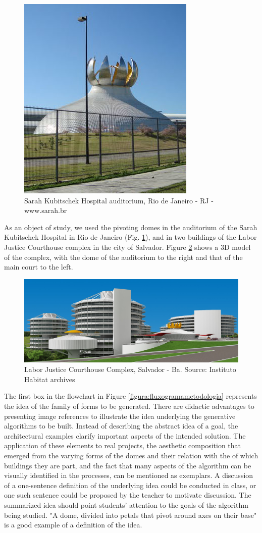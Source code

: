 \documentclass[preprint,12pt,3p]{elsarticle}
\begin{document}
\begin{figure}[!h]
\begin{center}
\includegraphics[width=0.3
\textwidth]{sarahcupula.jpg}
\caption{Sarah Kubitschek Hospital auditorium, Rio de Janeiro - RJ  -  www.sarah.br}
\label{figura:sarah}
\end{center}
\end{figure}

As an object of study, we used the pivoting domes in the auditorium of the Sarah Kubitschek Hospital in Rio de Janeiro (Fig. \ref{figura:sarah}), and in two buildings of the Labor Justice Courthouse complex in the city of Salvador. Figure \ref{figura:trt} shows a 3D model of the complex, with the dome of the auditorium to the right and that of the main court to the left.


\begin{figure}
\begin{center}
\includegraphics[width=0.7
\textwidth]{trt.jpg}
\caption{Labor Justice Courthouse Complex, Salvador - Ba. Source: Instituto Habitat archives}
\label{figura:trt}
\end{center}
\end{figure}

The first box in the flowchart in Figure \ref{figura:fluxogramametodologia} represents the idea of the family of forms to be generated. There are didactic advantages to presenting image references to illustrate the idea underlying the generative algorithms to be built. Instead of describing the abstract idea of a goal, the architectural examples clarify important aspects of the intended solution. The application of these elements to real projects, the aesthetic composition that emerged from the varying forms of the domes and their relation with the of which buildings they are part, and the fact that many aspects of the algorithm can be visually identified in the processes, can be mentioned as exemplars. A discussion of a one-sentence definition of the underlying idea could be conducted in class, or one such sentence could be proposed by the teacher to motivate discussion. The summarized idea should point students' attention to the goals of the algorithm being studied. "A dome, divided into petals that pivot around axes on their base" is a good example of a definition of the idea.
\end{document}
